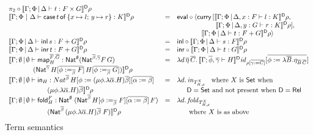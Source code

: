 \documentclass{lmcs}
\theoremstyle{plain}\newtheorem{satz}[thm]{Satz}
\newcommand{\inl}{\mathsf{inl}}
\newcommand{\inr}{\mathsf{inr}}
\newcommand{\fold}{\mathsf{fold}}
\newcommand{\set}{\mathsf{Set}}
\renewcommand{\id}{\mathit{id}}
\newcommand{\map}{\mathsf{map}}
\begin{document}
\begin{figure*}
{\begin{minipage}[t]{0.5\textwidth}
\[\begin{array}{lll}
\pi_2 \circ \dsem{\Gamma;\Phi \,|\, \Delta \vdash t : F \times
  G} \rho\\
\dsem{\Gamma;\Phi~|~\Delta \vdash \cse{t}{x \mapsto l}{y \mapsto r} :
  K}\rho & = & \eval \circ \langle \curry \,[\dsem{\Gamma;\Phi
    \,|\, \Delta, x : F \vdash l : K}\rho,\\
   & & \hspace*{0.79in} \dsem{\Gamma;\Phi \,|\, \Delta, y
    : G \vdash r : K}\rho],\\
   & &  \hspace*{0.5in} \dsem{\Gamma;\Phi \,|\, \Delta \vdash t :
  F + G} \rho\rangle\\   
\dsem{\Gamma;\Phi \,|\, \Delta \vdash \inl \,s: F + G} \rho& = &
\inl \circ \dsem{\Gamma;\Phi \,|\, \Delta \vdash s: F}\rho\\
\dsem{\Gamma;\Phi \,|\, \Delta \vdash \inr \,t: F + G}\rho & = & 
\inr \circ \dsem{\Gamma;\Phi \,|\, \Delta \vdash t : G}\rho\\
\llbracket \Gamma;\emptyset \,|\, \emptyset \vdash \map^{\ol{F},\ol{G}}_H
  : \Nat^\emptyset (\Nat^{\ol\beta,\ol\gamma} F\,G)
& = & \lambda d\, \ol\eta\,\ol{C}.\,
\dsem{\Gamma; \ol{\phi},\ol{\gamma}\vdash H}\id_{\rho[\ol{\gamma:=
      C}]}[\ol{\phi := \lambda \ol B. \eta_{\ol B\, \ol C}}]\\ 
\hspace*{0.5in}
  (\Nat^{\ol{\gamma}}\,H[\ol{\phi :=_{\ol{\beta}} F}]\,H[\ol{\phi
      :=_{\ol{\beta}} G}]) \rrbracket^{\mathsf D} \rho & &\\
\llbracket \Gamma;\emptyset \,|\, \emptyset \vdash \tin_H :
Nat^{\ol{\beta}} \, H[\phi := (\mu \phi.\lambda {\overline
    \alpha}.H){\overline \beta}][\ol{\alpha := \beta}] & = &
\lambda
d.\,\mathit{in}_{{T}^X_{H,\rho}} \;\;\mbox{ where } X \mbox{ is } \set \mbox{ when } \\ 
\hspace*{0.79in}(\mu \phi.\lambda {\overline \alpha}.H){\overline
  \beta} \rrbracket^{\mathsf{D}} \rho & & \hspace*{0.2in}  
\mathsf{D} = \set \mbox{ and not present when }
\mathsf{D} = \rel\\  
\llbracket \Gamma;\emptyset \,|\, \emptyset \vdash
  \fold^F_H : \Nat^\emptyset\;(\Nat^{\ol{\beta}}\,H[\phi
    :=_{\ol{\beta}} F][\ol{\alpha := \beta}]\,F) & = &  
\lambda d. \,\mathit{fold}_{T^X_{H,\rho}} \\ 
\hspace*{0.79in}(\Nat^{{\ol{\beta}} }\,(\mu
  \phi.\lambda \overline \alpha.H)\overline \beta\;F)
\rrbracket^{\mathsf{D}} \rho & & \hspace*{0.2in} \mbox{ where } X \mbox{ is as above
}\vspace*{-0.1in} 
\end{array}\]
\caption{Term semantics}\label{fig:term-sem} 
\end{minipage}}\vspace*{-0.05in}
\end{figure*}
\end{document}
